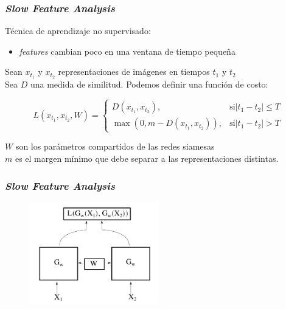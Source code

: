 \documentclass{beamer}
\begin{document}
\begin{frame}[plain]
\frametitle{\textit{Slow Feature Analysis}}

Técnica de aprendizaje no supervisado:
\begin{itemize}
    \item \textit{features} cambian poco en una ventana de tiempo pequeña \pause
	\end{itemize}

	Sean \(x_{t_1}\) y \(x_{t_2}\) representaciones de imágenes en tiempos \(t_1\) y \(t_2\)\\
Sea \(D\) una medida de similitud. Podemos definir una función de costo:

\begin{equation}
L(x_{t_1}, x_{t_2}, W) = \begin{cases}
                           D(x_{t_1}, x_{t_2}),& \text{si} |t_1 - t_2| \leq T \\ 
                           \max{(0, m - D(x_{t_1}, x_{t_2}))},& \text{si} |t_1 - t_2| > T
                         \end{cases}
\end{equation}

\(W\) son los parámetros compartidos de las redes siamesas\\
\(m\) es el margen mínimo que debe separar a las representaciones distintas.
\end{frame}





\begin{frame}[plain]
\frametitle{\textit{Slow Feature Analysis}}
\begin{figure}
    \centering
    \includegraphics[width=0.5\textwidth]{images/siamese-diagram.pdf}
\end{figure}
\end{frame}
\end{document}
